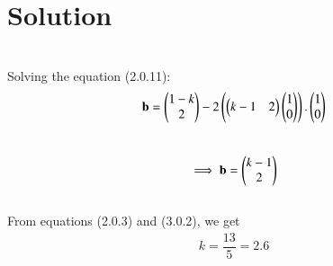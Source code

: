 \documentclass[journal,12pt,twocolumn]{IEEEtran}
\begin{document}
\section{Solution}
\\
Solving the equation (2.0.11):\\
\begin{align}
    \textbf{b}=\begin{pmatrix}1-k\\2\end{pmatrix}-2\left(\begin{pmatrix}k-1  & 2\end{pmatrix}\begin{pmatrix}1\\0\end{pmatrix}\right).\begin{pmatrix}1\\0\end{pmatrix}
\end{align}
\\ 
\begin{align}
    \implies \textbf{b}=\begin{pmatrix}k-1 \\ 2\end{pmatrix}
\end{align}
\\
From equations (2.0.3) and (3.0.2), we get
\begin{align}
    k=\dfrac{13}{5}=2.6
\end{align}
\end{document}
